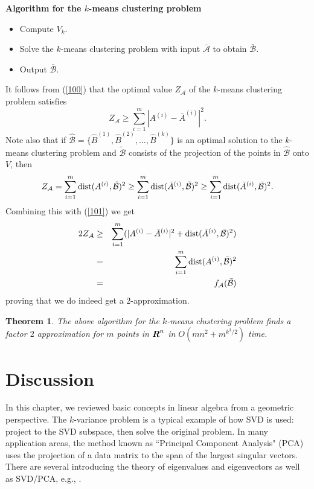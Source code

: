 \documentclass{book}
\newtheorem{theorem}{Theorem}[chapter]
\numberwithin{exercise}{chapter}
\begin{document}
{\bf Algorithm for the $k$-means clustering problem}
\begin{itemize}
\item Compute $V_{k}$.
\item Solve the $k$-means clustering problem
with input $\bar{{\mathcal A}}$ to obtain $\bar{{\mathcal B}}$.
\item Output $\bar{{\mathcal B}}$.
\end{itemize}
It follows from (\ref{100}) that the optimal value $Z_{{\mathcal A}}$
of the $k$-means clustering problem satisfies
\begin{equation}\label{101}
Z_{{\mathcal A}}\geq \sum_{i=1}^m|A^{(i)}-\bar{A}^{(i)}|^2.
\end{equation}
Note also that if $\hat{{\mathcal B}}=\{\hat{B}^{(1)},\hat{B}^{(2)},
 \ldots,\hat{B}^{(k)}\}$ is an optimal
solution to the $k$-means clustering problem
and $\tilde{{\mathcal B}}$ consists of the projection of the points in
$\hat{{\mathcal B}}$ onto $V$, then
$$
Z_{{\mathcal A}}= \sum_{i=1}^m\hbox{dist}(A^{(i)},\hat{{\mathcal B}})^2
\geq \sum_{i=1}^m\hbox{dist}(\bar{A}^{(i)},\tilde{{\mathcal B}})^2
\geq \sum_{i=1}^m\hbox{dist}(\bar{A}^{(i)},\bar{{\mathcal B}})^2.
$$
Combining this with (\ref{101}) we get
\begin{eqnarray*}
2Z_{{\mathcal A}} & \geq & \sum_{i=1}^m(|A^{(i)}-\bar{A}^{(i)}|^2+\hbox{dist}(\bar{A}^{(i)},\bar{{\mathcal B}})^2)\\
& = &\sum_{i=1}^m\hbox{dist}({A}^{(i)},\bar{{\mathcal B}})^2\\
& = &f_{{\mathcal A}}(\bar{{\mathcal B}})
\end{eqnarray*}
proving that we do indeed get a $2$-approximation.

\begin{theorem}
The above algorithm for the $k$-means clustering problem finds a factor $2$ approximation for $m$ points in $\mbox{\mbox{\boldmath $R$}}^n$ in $O(mn^2 + m^{k^3/2})$ time.
\end{theorem}

\section{Discussion}


In this chapter, we reviewed basic concepts in linear algebra from a geometric perspective. The $k$-variance problem is a typical example of how SVD is used: project to the SVD subspace, then solve the original problem. In many application areas, the method known as ``Principal Component Analysis" (PCA) uses the projection of a data matrix to the span of the largest singular vectors. There are several introducing the theory of eigenvalues and eigenvectors as well as SVD/PCA, e.g., \cite{GolubVanLoan, Strang, bhatia}.
\end{document}
